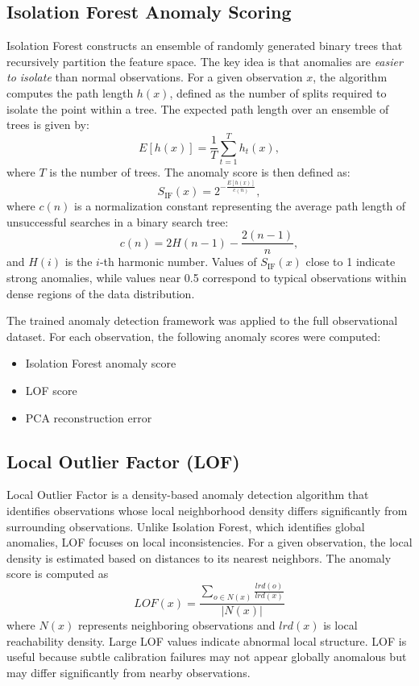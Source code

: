 \documentclass[linenumbers,trackchanges]{aastex701}
\begin{document}
\subsection{Isolation Forest Anomaly Scoring}
Isolation Forest constructs an ensemble of randomly generated binary trees that recursively partition the feature space. The key idea is that anomalies are \emph{easier to isolate} than normal observations. For a given observation $x$, the algorithm computes the path length $h(x)$, defined as the number of splits required to isolate the point within a tree. The expected path length over an ensemble of trees is given by:
\begin{equation}
E[h(x)] = \frac{1}{T} \sum_{t=1}^{T} h_t(x),
\end{equation}
where $T$ is the number of trees. The anomaly score is then defined as:
\begin{equation}
S_{\text{IF}}(x) = 2^{-\frac{E[h(x)]}{c(n)}},
\end{equation}
where $c(n)$ is a normalization constant representing the average path length of unsuccessful searches in a binary search tree:
\begin{equation}
c(n) = 2H(n - 1) - \frac{2(n - 1)}{n},
\end{equation}
and $H(i)$ is the $i$-th harmonic number. Values of $S_{\text{IF}}(x)$ close to 1 indicate strong anomalies, while values near 0.5 correspond to typical observations within dense regions of the data distribution.

The trained anomaly detection framework was applied to the full observational dataset. For each observation, the following anomaly scores were computed:
\begin{itemize}
\item Isolation Forest anomaly score
\item LOF score
\item PCA reconstruction error
\end{itemize}

\subsection{Local Outlier Factor (LOF)}
Local Outlier Factor is a density-based anomaly detection algorithm that identifies observations whose local neighborhood density differs significantly from surrounding observations. Unlike Isolation Forest, which identifies global anomalies, LOF focuses on local inconsistencies. For a given observation, the local density is estimated based on distances to its nearest neighbors. The anomaly score is computed as
\begin{equation}
LOF(x)=\frac{\sum_{o\in N(x)}\frac{lrd(o)}{lrd(x)}}{|N(x)|}
\end{equation}
where $N(x)$ represents neighboring observations and $lrd(x)$ is local reachability density. Large LOF values indicate abnormal local structure. LOF is useful because subtle calibration failures may not appear globally anomalous but may differ significantly from nearby observations.
\end{document}
